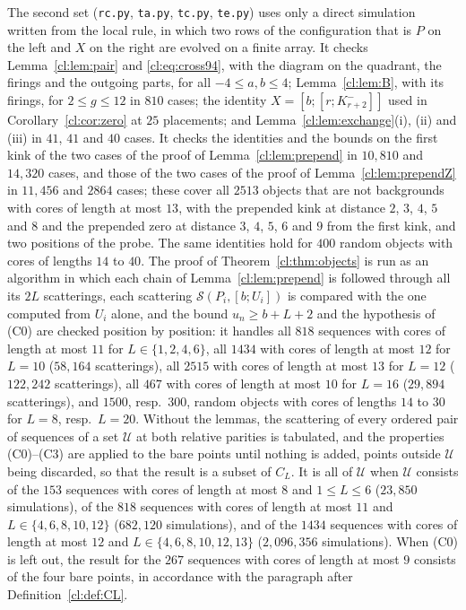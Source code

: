 The second set (\texttt{rc.py}, \texttt{ta.py}, \texttt{tc.py}, \texttt{te.py}) uses only a direct simulation written from the local rule, in which two rows of the configuration that is $P$ on the left and $X$ on the right are evolved on a finite array. It checks Lemma~\ref{cl:lem:pair} and \eqref{cl:eq:cross94}, with the diagram on the quadrant, the firings and the outgoing parts, for all $-4\le a,b\le4$; Lemma~\ref{cl:lem:B}, with its firings, for $2\le g\le12$ in $810$ cases; the identity $X=[b;[r;K^-_{r+2}]]$ used in Corollary~\ref{cl:cor:zero} at $25$ placements; and Lemma~\ref{cl:lem:exchange}(i), (ii) and (iii) in $41$, $41$ and $40$ cases. It checks the identities and the bounds on the first kink of the two cases of the proof of Lemma~\ref{cl:lem:prepend} in $10{,}810$ and $14{,}320$ cases, and those of the two cases of the proof of Lemma~\ref{cl:lem:prependZ} in $11{,}456$ and $2864$ cases; these cover all $2513$ objects that are not backgrounds with cores of length at most $13$, with the prepended kink at distance $2$, $3$, $4$, $5$ and $8$ and the prepended zero at distance $3$, $4$, $5$, $6$ and $9$ from the first kink, and two positions of the probe. The same identities hold for $400$ random objects with cores of lengths $14$ to $40$. The proof of Theorem~\ref{cl:thm:objects} is run as an algorithm in which each chain of Lemma~\ref{cl:lem:prepend} is followed through all its $2L$ scatterings, each scattering $\mathcal S(P_i,[b;U_i])$ is compared with the one computed from $U_i$ alone, and the bound $u_n\ge b+L+2$ and the hypothesis of (C0) are checked position by position: it handles all $818$ sequences with cores of length at most $11$ for $L\in\{1,2,4,6\}$, all $1434$ with cores of length at most $12$ for $L=10$ ($58{,}164$ scatterings), all $2515$ with cores of length at most $13$ for $L=12$ ($122{,}242$ scatterings), all $467$ with cores of length at most $10$ for $L=16$ ($29{,}894$ scatterings), and $1500$, resp.\ $300$, random objects with cores of lengths $14$ to $30$ for $L=8$, resp.\ $L=20$. Without the lemmas, the scattering of every ordered pair of sequences of a set $\mathcal U$ at both relative parities is tabulated, and the properties (C0)--(C3) are applied to the bare points until nothing is added, points outside $\mathcal U$ being discarded, so that the result is a subset of $C_L$. It is all of $\mathcal U$ when $\mathcal U$ consists of the $153$ sequences with cores of length at most $8$ and $1\le L\le6$ ($23{,}850$ simulations), of the $818$ sequences with cores of length at most $11$ and $L\in\{4,6,8,10,12\}$ ($682{,}120$ simulations), and of the $1434$ sequences with cores of length at most $12$ and $L\in\{4,6,8,10,12,13\}$ ($2{,}096{,}356$ simulations). When (C0) is left out, the result for the $267$ sequences with cores of length at most $9$ consists of the four bare points, in accordance with the paragraph after Definition~\ref{cl:def:CL}.
